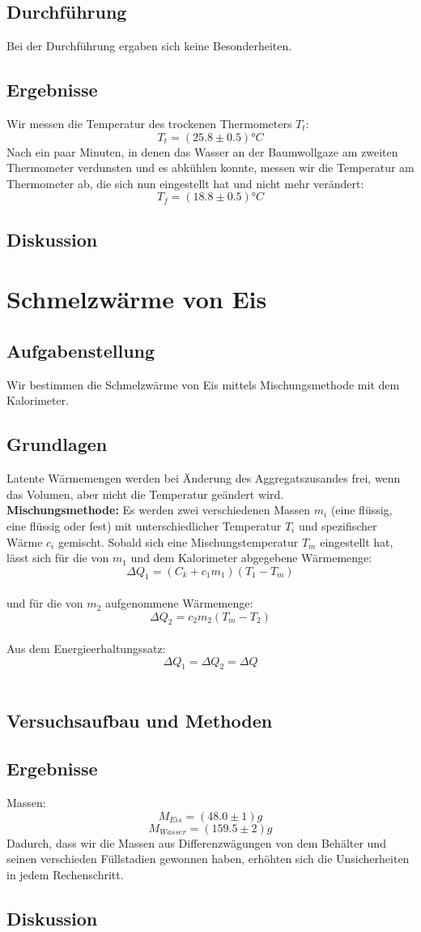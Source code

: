 \documentclass{article}
\begin{document}
\subsection{Durchführung}
Bei der Durchführung ergaben sich keine Besonderheiten. 
\subsection{Ergebnisse}
Wir messen die Temperatur des trockenen Thermometers $T_t$:
$$T_t=(25.8 \pm 0.5)°C$$
Nach ein paar Minuten, in denen das Wasser an der Baumwollgaze am zweiten Thermometer verdunsten und es abkühlen konnte, messen wir die Temperatur am Thermometer ab, die sich nun eingestellt hat und nicht mehr verändert:
$$T_f=(18.8 \pm 0.5)°C $$ 
\subsection{Diskussion}
\section{Schmelzwärme von Eis}
\subsection{Aufgabenstellung}
Wir bestimmen die Schmelzwärme von Eis mittels Mischungsmethode mit dem Kalorimeter.
\subsection{Grundlagen}
Latente Wärmemengen werden bei Änderung des Aggregatszusandes frei, wenn das Volumen, aber nicht die Temperatur geändert wird. \\
\textbf{Mischungsmethode:}
Es werden zwei verschiedenen Massen $m_i$ (eine flüssig, eine flüssig oder fest) mit unterschiedlicher Temperatur $T_i$ und spezifischer Wärme $c_i$ gemischt. Sobald sich eine Mischungstemperatur $T_m$ eingestellt hat, lässt sich für die von $m_1$ und dem Kalorimeter abgegebene Wärmemenge:\\
$$\Delta Q_1=(C_k + c_1m_1)(T_1 - T_m)$$\\
und für die von $m_2$ aufgenommene Wärmemenge: \\
$$\Delta Q_2=c_2m_2(T_m - T_2)$$\\
Aus dem Energieerhaltungssatz: \\
$$\Delta Q_1=\Delta Q_2=\Delta Q$$\\
\subsection{Versuchsaufbau und Methoden}

\subsection{Ergebnisse}
Massen:
$$M_{Eis}= (48.0 \pm 1)g$$
$$M_{Wasser} = (159.5 \pm 2)g$$
Dadurch, dass wir die Massen aus Differenzwägungen von dem Behälter und seinen verschieden Füllstadien gewonnen haben, erhöhten sich die Unsicherheiten in jedem Rechenschritt.
\subsection{Diskussion}
\end{document}
